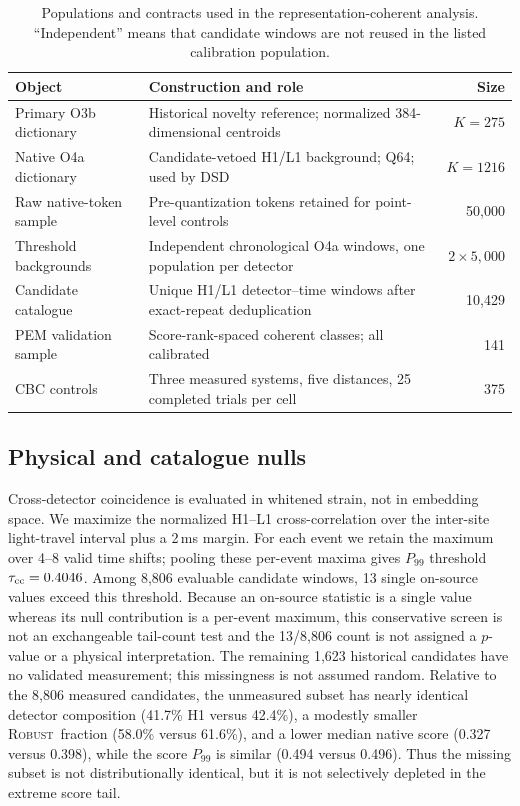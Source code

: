\documentclass[12pt]{article}
\newcommand{\robust}{\textsc{Robust}}
\begin{document}
\begin{table}[htbp]
\centering
\caption{Populations and contracts used in the representation-coherent
analysis.  ``Independent'' means that candidate windows are not reused in the
listed calibration population.}
\label{tab:contracts}
\small
\begin{tabularx}{\textwidth}{lXr}
\toprule
Object & Construction and role & Size \\
\midrule
Primary O3b dictionary & Historical novelty reference; normalized
384-dimensional centroids & $K=275$ \\
Native O4a dictionary & Candidate-vetoed H1/L1 background; Q64; used by DSD
& $K=1216$ \\
Raw native-token sample & Pre-quantization tokens retained for point-level
controls & 50,000 \\
Threshold backgrounds & Independent chronological O4a windows, one population
per detector & $2\times5,000$ \\
Candidate catalogue & Unique H1/L1 detector--time windows after exact-repeat deduplication
& 10,429 \\
PEM validation sample & Score-rank-spaced coherent classes; all calibrated
& 141 \\
CBC controls & Three measured systems, five distances, 25 completed trials per
cell & 375 \\
\bottomrule
\end{tabularx}
\end{table}

\subsection{Physical and catalogue nulls}

Cross-detector coincidence is evaluated in whitened strain, not in embedding
space.  We maximize the normalized H1--L1 cross-correlation over the
inter-site light-travel interval plus a 2\,ms margin.  For each event we retain
the maximum over 4--8 valid time shifts; pooling these per-event maxima gives
$P_{99}$ threshold $\tau_{\rm cc}=0.4046$.  Among 8,806 evaluable candidate
windows, 13 single on-source values exceed this threshold.  Because an
on-source statistic is a single value whereas its null contribution is a
per-event maximum, this conservative screen is not an exchangeable tail-count
test and the 13/8,806 count is not assigned a $p$-value or a physical
interpretation.  The remaining 1,623 historical candidates have no validated
measurement; this missingness is not assumed random.  Relative to the 8,806
measured candidates, the unmeasured subset has nearly identical detector
composition (41.7\% H1 versus 42.4\%), a modestly smaller \robust\ fraction
(58.0\% versus 61.6\%), and a lower median native score (0.327 versus 0.398),
while the score $P_{99}$ is similar (0.494 versus 0.496).  Thus the missing
subset is not distributionally identical, but it is not selectively depleted
in the extreme score tail.
\end{document}
